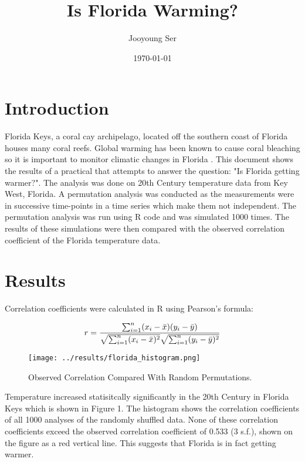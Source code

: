 \documentclass{article}
\title{Is Florida Warming?} %
\author{Jooyoung Ser} %
\date{\today} %
\begin{document}

\maketitle %
    
\section{Introduction}
	Florida Keys, a coral cay archipelago, located off the southern coast of Florida houses many coral reefs. Global warming has been known to cause coral bleaching so it is important to monitor climatic changes in Florida \cite{kuffner2015century}. This document shows the results of a practical that attempts to answer the question: "Is Florida getting warmer?". The analysis was done on 20th Century temperature data from Key West, Florida. A permutation analysis was conducted as the measurements were in successive time-points in a time series which make them not independent. The permutation analysis was run using R code and was simulated 1000 times. The results of these simulations were then compared with the observed correlation coefficient of the Florida temperature data.
	
\section{Results}
	Correlation coefficients were calculated in R using Pearson's formula:
		\begin{center}
			\begin{equation} 
				r = \frac{ \sum_{i=1}^{n}(x_i-\bar{x})(y_i-\bar{y}) }{%
				\sqrt{\sum_{i=1}^{n}(x_i-\bar{x})^2}\sqrt{\sum_{i=1}^{n}(y_i-\bar{y})^2}}
			\end{equation}
		\end{center}
	\begin{figure}[h!]
		\begin{center}
			\texttt{[image: ../results/florida\_histogram.png]}
		\end{center}
		\caption{Observed Correlation Compared With Random Permutations.}
		\label{fig1}
	\end{figure}

	Temperature increased statisitcally significantly in the 20th Century in Florida Keys which is shown in Figure 1. The histogram shows the correlation coefficients of all 1000 analyses of the randomly shuffled data. None of these correlation coefficients exceed the observed correlation coefficient of 0.533 (3 s.f.), shown on the figure as a red vertical line. This suggests that Florida is in fact getting warmer. 

	
\end{document}
